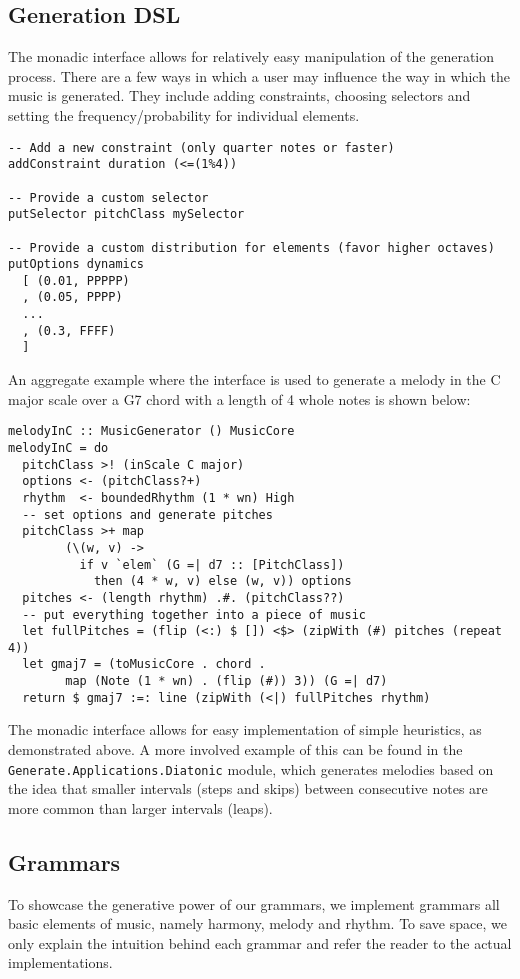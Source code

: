 \documentclass[11pt,a4paper]{article}
\newcommand{\icode}[1]{\texttt{#1}}
\begin{document}
\subsection{Generation DSL}
The monadic interface allows for relatively easy manipulation of the generation process. There are a few ways in which a user may influence the way in which the music is generated. They include adding constraints, choosing selectors and setting the frequency/probability for individual elements.

\begin{verbatim}
-- Add a new constraint (only quarter notes or faster)
addConstraint duration (<=(1%4))

-- Provide a custom selector
putSelector pitchClass mySelector

-- Provide a custom distribution for elements (favor higher octaves)
putOptions dynamics
  [ (0.01, PPPPP)
  , (0.05, PPPP)
  ...
  , (0.3, FFFF)
  ]
\end{verbatim}

An aggregate example where the interface is used to generate a melody in the C major scale over a G7 chord with a length of 4 whole notes is shown below:

\begin{verbatim}
melodyInC :: MusicGenerator () MusicCore
melodyInC = do
  pitchClass >! (inScale C major)
  options <- (pitchClass?+)
  rhythm  <- boundedRhythm (1 * wn) High
  -- set options and generate pitches
  pitchClass >+ map
        (\(w, v) ->
          if v `elem` (G =| d7 :: [PitchClass])
            then (4 * w, v) else (w, v)) options
  pitches <- (length rhythm) .#. (pitchClass??)
  -- put everything together into a piece of music
  let fullPitches = (flip (<:) $ []) <$> (zipWith (#) pitches (repeat 4))
  let gmaj7 = (toMusicCore . chord .
        map (Note (1 * wn) . (flip (#)) 3)) (G =| d7)
  return $ gmaj7 :=: line (zipWith (<|) fullPitches rhythm)
\end{verbatim}

The monadic interface allows for easy implementation of simple heuristics, as demonstrated above. A more involved example of this can be found in the \icode{Generate.Applications.Diatonic} module, which generates melodies based on the idea that smaller intervals (steps and skips) between consecutive notes are more common than larger intervals (leaps).

\subsection{Grammars}
To showcase the generative power of our grammars, we implement grammars all basic elements of music, namely harmony, melody and rhythm. To save space, we only explain the intuition behind each grammar and refer the reader to the actual implementations.
\end{document}
